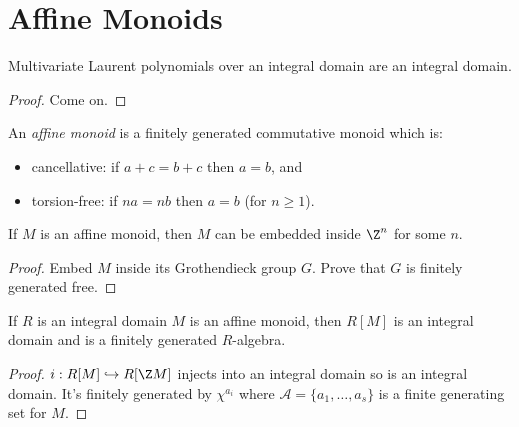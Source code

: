 \section{Affine Monoids}


\begin{lemma}
  \label{0-mv-laurent-poly-domain}
  \leanok

  Multivariate Laurent polynomials over an integral domain are an integral domain.
\end{lemma}
\begin{proof}
  \leanok

  Come on.
\end{proof}


\begin{definition}
  \label{0-aff-mon}
  \leanok

  An \emph{affine monoid} is a finitely generated commutative monoid which is:
  \begin{itemize}
    \item cancellative: if $a + c = b + c$ then $a = b$, and
    \item torsion-free: if $n a = n b$ then $a = b$ (for $n \geq 1$).
  \end{itemize}
\end{definition}


\begin{proposition}
  \label{0-embed-aff-mon}
  \leanok

  If $M$ is an affine monoid, then $M$ can be embedded inside $\Z^n$ for some $n$.
\end{proposition}
\begin{proof}
  \leanok

  Embed $M$ inside its Grothendieck group $G$. Prove that $G$ is finitely generated free.
\end{proof}


\begin{proposition}
  \label{0-aff-mon-alg-domain}
  \leanok

  If $R$ is an integral domain $M$ is an affine monoid, then $R[M]$ is an integral domain and is a finitely generated $R$-algebra.
\end{proposition}
\begin{proof}
  \leanok

  $i : R[M] \hookrightarrow R[\Z M]$ injects into an integral domain so is an integral domain. It's finitely generated by $\chi^{a_i}$ where $\mathcal A = \{a_1, \dotsc, a_s\}$ is a finite generating set for $M$.
\end{proof}


